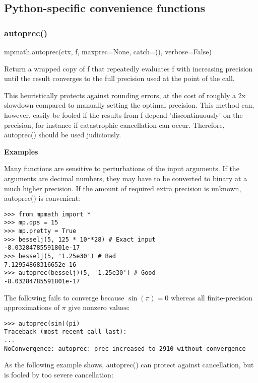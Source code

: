 \subsection{Python-specific convenience functions}

\subsubsection{autoprec()}

mpmath.autoprec(ctx, f, maxprec=None, catch=(), verbose=False)

\vpara
Return a wrapped copy of f that repeatedly evaluates f with increasing precision until the result converges to the full precision used at the point of the call.

\vpara
This heuristically protects against rounding errors, at the cost of roughly a 2x slowdown compared to manually setting the optimal precision. This method can, however, easily be fooled if the results from f depend 'discontinuously' on the precision, for instance if catastrophic cancellation can occur. Therefore, autoprec() should be used judiciously.

\vpara
\textbf{Examples}

\vpara
Many functions are sensitive to perturbations of the input arguments. If the arguments are decimal numbers, they may have to be converted to binary at a much higher precision. If the amount of required extra precision is unknown, autoprec() is convenient:

\begin{lstlisting}
>>> from mpmath import *
>>> mp.dps = 15
>>> mp.pretty = True
>>> besselj(5, 125 * 10**28) # Exact input
-8.03284785591801e-17
>>> besselj(5, '1.25e30') # Bad
7.12954868316652e-16
>>> autoprec(besselj)(5, '1.25e30') # Good
-8.03284785591801e-17
\end{lstlisting}


The following fails to converge because $\sin(\pi)=0$ whereas all finite-precision approximations of $\pi$ give nonzero values:

\begin{lstlisting}
>>> autoprec(sin)(pi)
Traceback (most recent call last):
...
NoConvergence: autoprec: prec increased to 2910 without convergence
\end{lstlisting}

As the following example shows, autoprec() can protect against cancellation, but is fooled by too severe cancellation:

